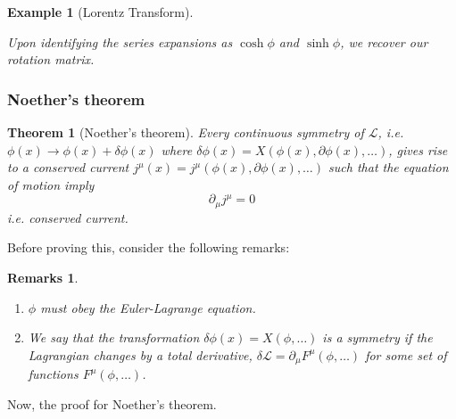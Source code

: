 \documentclass[a4paper]{article}
\newtheorem{remarks}{Remarks}[section]
\newtheorem{eg}{Example}[section]
\theoremstyle{new}
\newtheorem{thm}{Theorem}[section]
\begin{document}
\begin{eg}[Lorentz Transform]
\begin{itemize}
    Upon identifying the series expansions as $\cosh\phi$ and $\sinh\phi$, we recover our rotation matrix.
\end{itemize}
\end{eg}
\newpage
\subsubsection{Noether's theorem}
\begin{thm}[Noether's theorem]
Every continuous symmetry of $\mathcal{L}$, i.e. $\phi(x)\rightarrow\phi(x)+\delta\phi(x)$ where $\delta\phi(x)=X(\phi(x),\partial\phi(x),\dots)$, gives rise to a conserved current $j^\mu(x)=j^\mu(\phi(x),\partial\phi(x),\dots)$ such that the equation of motion imply
$$\partial_\mu j^\mu=0$$
i.e. conserved current. 
\end{thm}
Before proving this, consider the following remarks:
\begin{remarks}\leavevmode
\begin{enumerate}
    \item $\phi$ must obey the Euler-Lagrange equation.
    \item We say that the transformation $\delta\phi(x)=X(\phi,\dots)$ is a symmetry if the Lagrangian changes by a total derivative, $\delta\mathcal{L}=\partial_\mu F^\mu(\phi,\dots)$ for some set of functions $F^\mu(\phi,\dots)$.
\end{enumerate}
\end{remarks}
Now, the proof for Noether's theorem.
\end{document}
